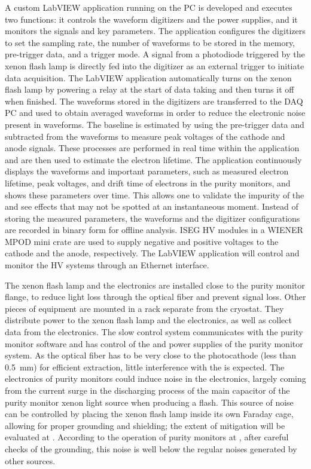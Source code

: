A custom LabVIEW application running on the  PC is developed and executes two functions: it controls the waveform digitizers and the power supplies, and it monitors the signals and key parameters. The application configures the digitizers to set the sampling rate, the number of waveforms to be stored in the memory, pre-trigger data, and a trigger mode. A signal from a photodiode triggered by the xenon flash lamp is directly fed into the digitizer as an external trigger to initiate data acquisition. The LabVIEW application automatically turns on the xenon flash lamp by powering a relay at the start of data taking and then turns it off when finished.
The waveforms stored in the digitizers are transferred to the DAQ PC and used to obtain averaged waveforms in order to reduce the electronic noise present in waveforms. The baseline is estimated by using the pre-trigger data and subtracted from the waveforms to measure peak voltages of the cathode and anode signals. These processes are performed in real time within the application and are then used to estimate the electron lifetime.
The application continuously displays the waveforms and important parameters, such as measured electron lifetime, peak voltages, and drift time of electrons in the purity monitors, and shows these parameters over time.
This allows one to validate the impurity of the  and see effects that may not be spotted at an instantaneous moment. Instead of storing the measured parameters, the waveforms and the digitizer configurations are recorded in binary form for offline analysis. ISEG HV modules in a WIENER MPOD mini crate are used to supply negative and positive voltages to the cathode and the anode, respectively. The LabVIEW application will control and monitor the HV systems through an Ethernet interface.  

The xenon flash lamp and the  electronics are installed close to the purity monitor flange, to reduce light loss through the optical fiber and prevent signal loss. Other pieces of equipment are mounted in a rack separate from the cryostat. They distribute power to the xenon flash lamp and the  electronics, as well as collect data from the electronics. The slow control system communicates with the purity monitor  software and has control of the  and  power supplies of the purity monitor system. As the optical fiber has to be very close to the photocathode (less than \SI{0.5}{\milli\meter}) for efficient \phel extraction, little interference with the  is expected. 
The electronics of purity monitors could induce noise in the  electronics, largely coming from the current surge in the discharging process of the main capacitor of the purity monitor xenon light source when producing a flash.  This source of noise can be controlled by placing the xenon flash lamp inside its own Faraday cage, allowing for proper grounding and shielding; the extent of mitigation will be evaluated at . According to the operation of purity monitors at , after careful checks of the grounding, this noise is well below the regular noises generated by other sources.

